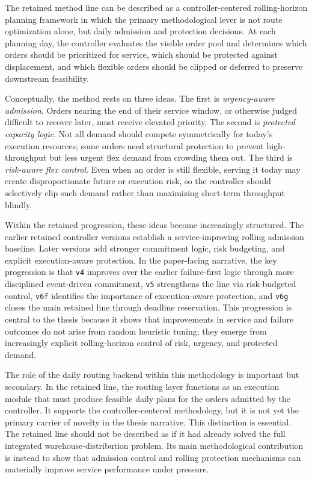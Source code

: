 The retained method line can be described as a controller-centered rolling-horizon planning framework in which the primary methodological lever is not route optimization alone, but daily admission and protection decisions. At each planning day, the controller evaluates the visible order pool and determines which orders should be prioritized for service, which should be protected against displacement, and which flexible orders should be clipped or deferred to preserve downstream feasibility.

Conceptually, the method rests on three ideas. The first is \emph{urgency-aware admission}. Orders nearing the end of their service window, or otherwise judged difficult to recover later, must receive elevated priority. The second is \emph{protected capacity logic}. Not all demand should compete symmetrically for today's execution resources; some orders need structural protection to prevent high-throughput but less urgent flex demand from crowding them out. The third is \emph{risk-aware flex control}. Even when an order is still flexible, serving it today may create disproportionate future or execution risk, so the controller should selectively clip such demand rather than maximizing short-term throughput blindly.

Within the retained progression, these ideas become increasingly structured. The earlier retained controller versions establish a service-improving rolling admission baseline. Later versions add stronger commitment logic, risk budgeting, and explicit execution-aware protection. In the paper-facing narrative, the key progression is that \texttt{v4} improves over the earlier failure-first logic through more disciplined event-driven commitment, \texttt{v5} strengthens the line via risk-budgeted control, \texttt{v6f} identifies the importance of execution-aware protection, and \texttt{v6g} closes the main retained line through deadline reservation. This progression is central to the thesis because it shows that improvements in service and failure outcomes do not arise from random heuristic tuning; they emerge from increasingly explicit rolling-horizon control of risk, urgency, and protected demand.

The role of the daily routing backend within this methodology is important but secondary. In the retained line, the routing layer functions as an execution module that must produce feasible daily plans for the orders admitted by the controller. It supports the controller-centered methodology, but it is not yet the primary carrier of novelty in the thesis narrative. This distinction is essential. The retained line should not be described as if it had already solved the full integrated warehouse-distribution problem. Its main methodological contribution is instead to show that admission control and rolling protection mechanisms can materially improve service performance under pressure.


